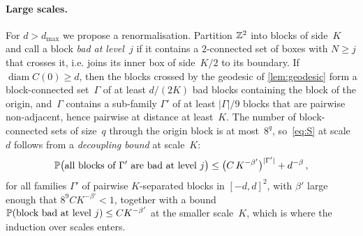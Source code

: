 \documentclass[11pt,letterpaper]{article}
\DeclareMathOperator{\diam}{diam}
\begin{document}
\paragraph{Large scales.} For $d>d_{\max}$ we propose a renormalisation. Partition $\Z^2$ into blocks of side~$K$ and call a block \emph{bad at level~$j$} if it contains a $2$-connected set of boxes with $N\ge j$ that crosses it, i.e. joins its inner box of side~$K/2$ to its boundary. If $\diam C(0)\ge d$, then the blocks crossed by the geodesic of \cref{lem:geodesic} form a block-connected set~$\Gamma$ of at least $d/(2K)$ bad blocks containing the block of the origin, and~$\Gamma$ contains a sub-family $\Gamma'$ of at least $\lvert\Gamma\rvert/9$ blocks that are pairwise non-adjacent, hence pairwise at distance at least~$K$. The number of block-connected sets of size~$q$ through the origin block is at most~$8^q$, so~\eqref{eq:S} at scale~$d$ follows from a \emph{decoupling bound} at scale~$K$:
\begin{equation}
\label{eq:decoupling}
  \P\bigl(\text{all blocks of }\Gamma'\text{ are bad at level }j\bigr)\le\bigl(C\,K^{-\beta'}\bigr)^{\lvert\Gamma'\rvert}+d^{-\beta}\,,
\end{equation}
for all families $\Gamma'$ of pairwise $K$-separated blocks in $[-d,d]^2$, with $\beta'$ large enough that $8^{9}C K^{-\beta'}<1$, together with a bound $\P(\text{block bad at level }j)\le CK^{-\beta'}$ at the smaller scale~$K$, which is where the induction over scales enters.
\end{document}
